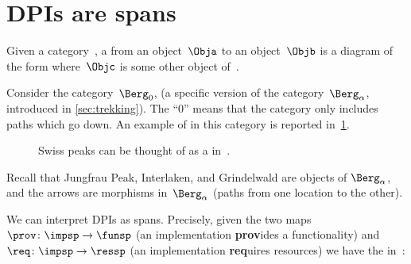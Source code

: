 
\section{DPIs are spans}
\label{sec:spans}


\begin{ctdefinition}[Span]
    \label{def:span}
    Given a category~\CatC, a  from an object~$\Obja$ to an object~$\Objb$ is a diagram of the form
    where~$\Objc$ is some other object of~\CatC.
\end{ctdefinition}

\begin{example}
    Consider the category~$\Berg_0$, (a specific version of the category~$\Berg_\alpha$, introduced in \cref{sec:trekking}).
    The ``0'' means that the category only includes paths which go down.
    An example of  in this category is reported in~\cref{fig:exmountains}.
    \begin{figure}[h!]
        \centering
        \caption{Swiss peaks can be thought of as a  in~\Berg.}
        \label{fig:exmountains}
    \end{figure}
    Recall that \textsf{Jungfrau Peak}, \textsf{Interlaken}, and \textsf{Grindelwald} are objects of $\Berg_\alpha$, and the arrows are morphisms in~$\Berg_\alpha$ (paths from one location to the other).
\end{example}

We can interpret DPIs as spans.
Precisely, given the two maps~$\prov \colon \impsp \to \funsp$ (an implementation \textbf{prov}ides a functionality) and~$\req\colon \impsp \to \ressp$ (an implementation \textbf{req}uires resources) we have the  in~\Set:
%

